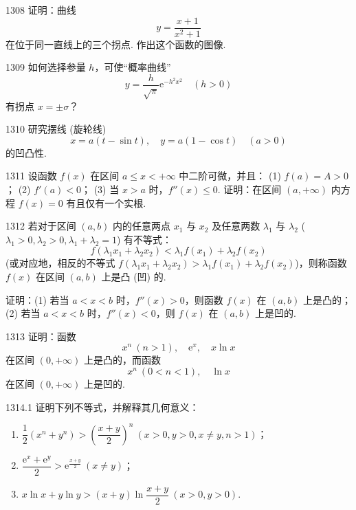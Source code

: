 \begin{prob}[M]{1308}
证明：曲线
\[
y = \frac{x + 1}{x^2 + 1}
\]
在位于同一直线上的三个拐点. 作出这个函数的图像.
\end{prob}

\begin{prob}[M]{1309}
如何选择参量 $h$，可使“概率曲线”
\[
y = \frac{h}{\sqrt{\pi}} \mathrm{e}^{-h^2 x^2} \quad (h > 0)
\]
有拐点 $x = \pm \sigma$？
\end{prob}

\begin{prob}[M]{1310}
研究摆线 (旋轮线)
\[
x = a(t - \sin t), \quad y = a(1 - \cos t) \quad (a > 0)
\]
的凹凸性.
\end{prob}

\begin{prob}[M]{1311}
设函数 $f(x)$ 在区间 $a \leqslant x < +\infty$ 中二阶可微，并且：
(1) $f(a) = A > 0$； (2) $f'(a) < 0$； (3) 当 $x > a$ 时，$f''(x) \leqslant 0$.
证明：在区间 $(a, +\infty)$ 内方程 $f(x) = 0$ 有且仅有一个实根.
\end{prob}

\begin{prob}[M]{1312}
若对于区间 $(a, b)$ 内的任意两点 $x_1$ 与 $x_2$ 及任意两数 $\lambda_1$ 与 $\lambda_2$ ($\lambda_1 > 0, \lambda_2 > 0, \lambda_1 + \lambda_2 = 1$) 有不等式：
\[
f(\lambda_1 x_1 + \lambda_2 x_2) < \lambda_1 f(x_1) + \lambda_2 f(x_2)
\]
(或对应地，相反的不等式 $f(\lambda_1 x_1 + \lambda_2 x_2) > \lambda_1 f(x_1) + \lambda_2 f(x_2)$)，则称函数 $f(x)$ 在区间 $(a, b)$ 上是凸 (凹) 的.

证明：(1) 若当 $a < x < b$ 时，$f''(x) > 0$，则函数 $f(x)$ 在 $(a, b)$ 上是凸的；(2) 若当 $a < x < b$ 时，$f''(x) < 0$，则 $f(x)$ 在 $(a, b)$ 上是凹的.
\end{prob}

\begin{prob}[M]{1313}
证明：函数
\[
x^n \ (n > 1), \quad \mathrm{e}^x, \quad x \ln x
\]
在区间 $(0, +\infty)$ 上是凸的，而函数
\[
x^n \ (0 < n < 1), \quad \ln x
\]
在区间 $(0, +\infty)$ 上是凹的.
\end{prob}

\begin{prob}[L]{1314.1}
证明下列不等式，并解释其几何意义：
\begin{enumerate}[label=(\alph*), itemsep=2pt, topsep=3pt]
\item $\dfrac{1}{2}(x^n + y^n) > \left(\dfrac{x + y}{2}\right)^n \ (x > 0, y > 0, x \neq y, n > 1)$；
\item $\dfrac{\mathrm{e}^x + \mathrm{e}^y}{2} > \mathrm{e}^{\frac{x+y}{2}} \ (x \neq y)$；
\item $x \ln x + y \ln y > (x + y)\ln\dfrac{x + y}{2} \ (x > 0, y > 0)$.
\end{enumerate}
\end{prob}

